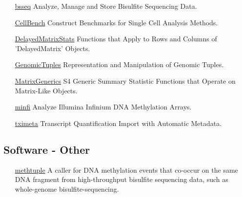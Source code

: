 \documentclass[11pt,letterpaper,pdf]{article}
\begin{document}
\begin{enumerate}[labelindent=1cm,align=left]
  \item[\href{https://www.bioconductor.org/packages/bsseq}{bsseq}]
    Analyze, Manage and Store Bisulfite Sequencing Data.
  \item[\href{https://www.bioconductor.org/packages/CellBench}{CellBench}]
    Construct Benchmarks for Single Cell Analysis Methods.
  \item[\href{https://www.bioconductor.org/packages/DelayedMatrixStats}{DelayedMatrixStats}]
    Functions that Apply to Rows and Columns of 'DelayedMatrix' Objects.
  \item[\href{https://www.bioconductor.org/packages/GenomicTuples}{GenomicTuples}]
    Representation and Manipulation of Genomic Tuples.
  \item[\href{https://www.bioconductor.org/packages/MatrixGenerics}{MatrixGenerics}]
    S4 Generic Summary Statistic Functions that Operate on Matrix-Like Objects.
  \item[\href{https://www.bioconductor.org/packages/minfi}{minfi}]
    Analyze Illumina Infinium DNA Methylation Arrays.
  \item[\href{https://www.bioconductor.org/packages/tximeta}{tximeta}]
    Transcript Quantification Import with Automatic Metadata.
\end{enumerate}

\subsection*{Software - Other}

\begin{enumerate}[labelindent=1cm,align=left]
  \item[\href{https://pypi.python.org/pypi/methtuple/}{methtuple}] A caller for DNA methylation events that co-occur on the same DNA fragment from high-throughput bisulfite sequencing data, such as whole-genome bisulfite-sequencing.
\end{enumerate}
\end{document}
